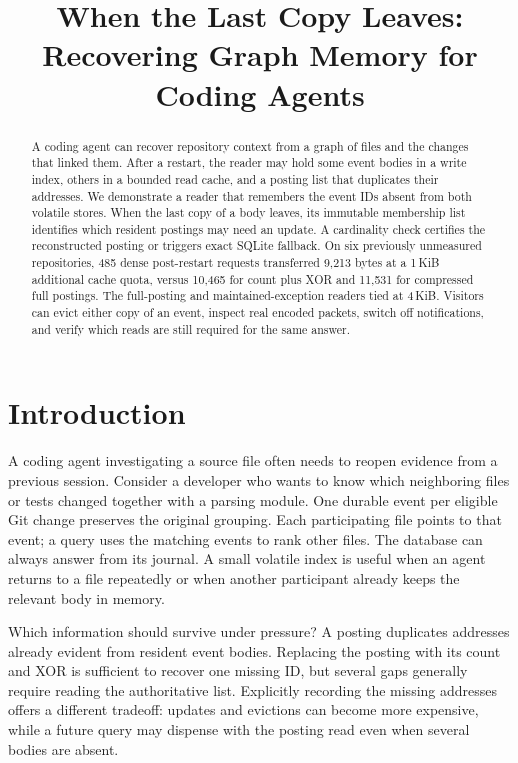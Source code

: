 \documentclass[conference]{IEEEtran}
\title{When the Last Copy Leaves:\\Recovering Graph Memory for Coding Agents}
\author{\IEEEauthorblockN{Anonymous working draft}}
\begin{document}
\maketitle
\begin{abstract}
A coding agent can recover repository context from a graph of files and the changes that linked them. After a restart, the reader may hold some event bodies in a write index, others in a bounded read cache, and a posting list that duplicates their addresses. We demonstrate a reader that remembers the event IDs absent from both volatile stores. When the last copy of a body leaves, its immutable membership list identifies which resident postings may need an update. A cardinality check certifies the reconstructed posting or triggers exact SQLite fallback. On six previously unmeasured repositories, 485 dense post-restart requests transferred 9,213 bytes at a 1\,KiB additional cache quota, versus 10,465 for count plus XOR and 11,531 for compressed full postings. The full-posting and maintained-exception readers tied at 4\,KiB. Visitors can evict either copy of an event, inspect real encoded packets, switch off notifications, and verify which reads are still required for the same answer.
\end{abstract}
\section{Introduction}
A coding agent investigating a source file often needs to reopen evidence from a previous session. Consider a developer who wants to know which neighboring files or tests changed together with a parsing module. One durable event per eligible Git change preserves the original grouping. Each participating file points to that event; a query uses the matching events to rank other files. The database can always answer from its journal. A small volatile index is useful when an agent returns to a file repeatedly or when another participant already keeps the relevant body in memory.

Which information should survive under pressure? A posting duplicates addresses already evident from resident event bodies. Replacing the posting with its count and XOR is sufficient to recover one missing ID, but several gaps generally require reading the authoritative list. Explicitly recording the missing addresses offers a different tradeoff: updates and evictions can become more expensive, while a future query may dispense with the posting read even when several bodies are absent.
\end{document}
